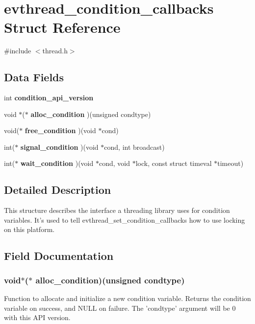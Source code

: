 \section{evthread\-\_\-condition\-\_\-callbacks \-Struct \-Reference}
\label{structevthread__condition__callbacks}


{\ttfamily \#include $<$thread.\-h$>$}

\subsection*{\-Data \-Fields}
\begin{DoxyCompactItemize}
\item 
int {\bf condition\-\_\-api\-\_\-version}
\item 
void $\ast$($\ast$ {\bf alloc\-\_\-condition} )(unsigned condtype)
\item 
void($\ast$ {\bf free\-\_\-condition} )(void $\ast$cond)
\item 
int($\ast$ {\bf signal\-\_\-condition} )(void $\ast$cond, int broadcast)
\item 
int($\ast$ {\bf wait\-\_\-condition} )(void $\ast$cond, void $\ast$lock, const struct timeval $\ast$timeout)
\end{DoxyCompactItemize}


\subsection{\-Detailed \-Description}
\-This structure describes the interface a threading library uses for condition variables. \-It's used to tell evthread\-\_\-set\-\_\-condition\-\_\-callbacks how to use locking on this platform. 

\subsection{\-Field \-Documentation}
\subsubsection[{alloc\-\_\-condition}]{\setlength{\rightskip}{0pt plus 5cm}void$\ast$($\ast$ {\bf alloc\-\_\-condition})(unsigned condtype)}\label{structevthread__condition__callbacks_a4b30fd8e12cc870c369766d927a0a05c}
\-Function to allocate and initialize a new condition variable. \-Returns the condition variable on success, and \-N\-U\-L\-L on failure. \-The 'condtype' argument will be 0 with this \-A\-P\-I version. 
